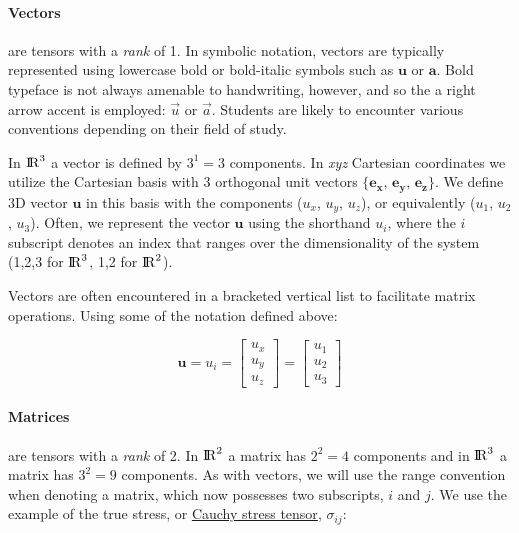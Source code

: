 \paragraph{Vectors}are tensors with a \emph{rank} of 1. In symbolic notation, vectors are typically represented using lowercase bold or bold-italic symbols such as $\mathbf{u}$ or $\pmb{a}$. Bold typeface is not always amenable to handwriting, however, and so the a right arrow accent is employed: $\vec{u}$ or $\vec{a}$.  Students are likely to encounter various conventions depending on their field of study.

In ${\rm I\!R}^3$ a vector is defined by $3^{1} = 3$ components. In \textit{xyz} Cartesian coordinates we utilize the Cartesian basis with 3 orthogonal unit vectors $\{\mathbf{e}_{\mathbf{x}}\text{, } \mathbf{e}_{\mathbf{y}}\text{, } \mathbf{e}_{\mathbf{z}}\}$. We define 3D vector $\mathbf{u}$ in this basis with the components ($u_x$, $u_y$, $u_z$), or equivalently  ($u_1$, $u_2$, $u_3$). Often, we represent the vector $\mathbf{u}$ using the shorthand $u_i$, where the $i$ subscript denotes an index that ranges over the dimensionality of the system (1,2,3 for ${\rm I\!R}^3$, 1,2 for ${\rm I\!R}^2$). %

Vectors are often encountered in a bracketed vertical list to facilitate matrix operations. Using some of the notation defined above:

\begin{equation}
\mathbf{u} = u_i = 
	\begin{bmatrix}
    u_x \\
    u_y \\
    u_z
	\end{bmatrix} =
	\begin{bmatrix}
    u_1 \\
    u_2 \\
    u_3
	\end{bmatrix}
	\label{eq:Vector}
\end{equation}

\paragraph{Matrices}are tensors with a \emph{rank} of 2.  In ${\rm I\!R}^2$ a matrix has $2^{2} = 4$ components and in ${\rm I\!R}^3$ a matrix has $3^{2} = 9$ components. As with vectors, we will use the range convention when denoting a matrix, which now possesses two subscripts, $i$ and $j$. We use the example of the true stress, or \href{https://en.wikipedia.org/wiki/Cauchy_stress_tensor}{Cauchy stress tensor}, $\sigma_{ij}$:

